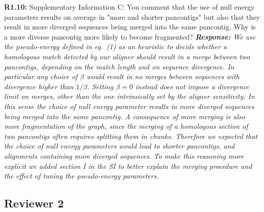 \documentclass[aps,rmp,onecolumn]{revtex4-1}
\newcommand{\Marco}[1]{{\color{gray}Marco: #1}}
\newcommand{\Liam}[1]{{\color{teal}Liam: #1}}
\newcommand{\reviewer}[2]{\textbf{#1:} #2\vskip 5mm}
\newcommand{\response}[1]{{\it {\color{response}\textbf{Response:} #1}}\vskip 5mm}
\begin{document}
\reviewer{R1.10}{Supplementary Information C: You comment that the use of null energy parameters results on average in "more and shorter pancontigs" but also that they result in more diverged sequences being merged into the same pancontig. Why is a more diverse pancontig more likely to become fragmented?}
\response{We use the pseudo-energy defined in eq.~(1) as an heuristic to decide whether a homologous match detected by our aligner should result in a merge between two pancontigs, depending on the match length and on sequence divergence. In particular any choice of $\beta$ would result in no merges between sequences with divergence higher than $1/\beta$. Setting $\beta=0$ instead does not impose a divergence limit on merges, other than the one intrinsically set by the aligner sensitivity. In this sense the choice of null energy parameter results in more diverged sequences being merged into the same pancontig. A consequence of more merging is also more fragmentation of the graph, since the merging of a homologous section of two pancontigs often requires splitting them in chunks. Therefore we expected that the choice of null energy parameters would lead to shorter pancontigs, and alignments containing more diverged sequences.
      To make this reasoning more explicit we added section I in the SI to better explain the merging procedure and the effect of tuning the pseudo-energy parameters.}


\subsection*{Reviewer 2}
\end{document}

